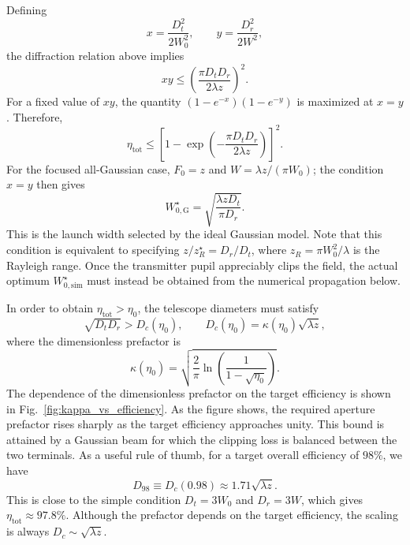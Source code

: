 \documentclass[a4paper,10pt]{article}
\begin{document}
Defining
\begin{equation}
    x = \frac{D_t^2}{2W_0^2}, \qquad y = \frac{D_r^2}{2W^2},
\end{equation}
the diffraction relation above implies
\begin{equation}
    xy \leq \left(\frac{\pi D_tD_r}{2\lambda z}\right)^2.
\end{equation}
For a fixed value of $xy$, the quantity $(1-e^{-x})(1-e^{-y})$ is maximized at $x=y$. Therefore,
\begin{equation}
    \eta_{\mathrm{tot}} \leq \left[1-\exp\left(-\frac{\pi D_tD_r}{2\lambda z}\right)\right]^2.
\end{equation}
For the focused all-Gaussian case, $F_0=z$ and $W=\lambda z/(\pi W_0)$; the condition $x=y$ then gives
\begin{equation}
    W_{0,\mathrm{G}}^\star = \sqrt{\frac{\lambda z D_t}{\pi D_r}}.
\end{equation}
This is the launch width selected by the ideal Gaussian model. Note that this condition is equivalent to specifying $z/z_R^\star = D_r / D_t$, where $z_R = \pi W_0^2 / \lambda$ is the Rayleigh range. Once the transmitter pupil appreciably clips the field, the actual optimum $W_{0,\mathrm{sim}}^\star$ must instead be obtained from the numerical propagation below.

In order to obtain $\eta_{\mathrm{tot}} > \eta_0$, the telescope diameters must satisfy
\begin{equation}
    \sqrt{D_tD_r} > D_c(\eta_0), \qquad
    D_c(\eta_0) = \kappa(\eta_0)\sqrt{\lambda z},
\end{equation}
where the dimensionless prefactor is
\begin{equation}
    \kappa(\eta_0) = \sqrt{\frac{2}{\pi}\ln\left(\frac{1}{1-\sqrt{\eta_0}}\right)}.
\end{equation}
The dependence of the dimensionless prefactor on the target efficiency is shown in Fig.~\ref{fig:kappa_vs_efficiency}. As the figure shows, the required aperture prefactor rises sharply as the target efficiency approaches unity. This bound is attained by a Gaussian beam for which the clipping loss is balanced between the two terminals. As a useful rule of thumb, for a target overall efficiency of $98\%$, we have
\begin{equation}
    D_{98} \equiv D_c(0.98) \approx 1.71\sqrt{\lambda z}.
\end{equation}
This is close to the simple condition $D_t = 3W_0$ and $D_r = 3W$, which gives $\eta_{\mathrm{tot}} \approx 97.8\%$. Although the prefactor depends on the target efficiency, the scaling is always $D_c \sim \sqrt{\lambda z}$.
\end{document}
